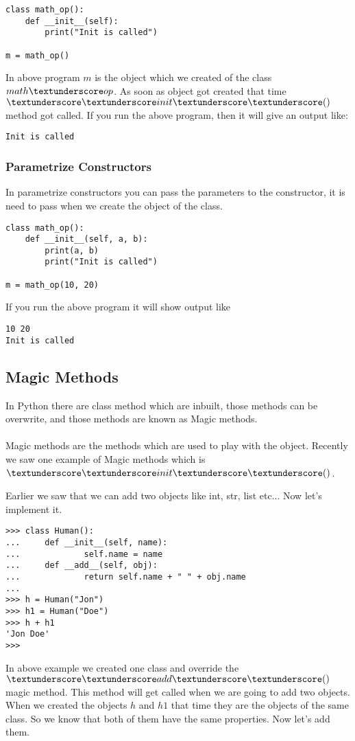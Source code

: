 \documentclass[letterpaper,12pt]{book}
\begin{document}
\begin{lstlisting}
class math_op():
    def __init__(self):
        print("Init is called")

m = math_op()
\end{lstlisting}
In above program $m$ is the object which we created of the class $math \textunderscore op$. As soon as object got created that time $\textunderscore\textunderscore init\textunderscore\textunderscore()$ method got called. 
If you run the above program, then it will give an output like:
\begin{lstlisting}
Init is called
\end{lstlisting}
\subsubsection{Parametrize Constructors}
In parametrize constructors you can pass the parameters to the constructor, it is need to pass when we create the object of the class.

\begin{lstlisting}
class math_op():
    def __init__(self, a, b):
        print(a, b)
        print("Init is called")
		
m = math_op(10, 20)
\end{lstlisting}
If you run the above program it will show output like
\begin{lstlisting}
10 20
Init is called
\end{lstlisting}
\subsection{Magic Methods}
In Python there are class method which are inbuilt, those methods can be overwrite, and those methods are known as Magic methods.
\paragraph{}
Magic methods are the methods which are used to play with the object. Recently we saw one example of Magic methods which is $\textunderscore\textunderscore init \textunderscore\textunderscore()$.

Earlier we saw that we can add two objects like int, str, list etc... Now let's implement it. 
\begin{lstlisting}
>>> class Human():
...     def __init__(self, name):
...             self.name = name
...     def __add__(self, obj):
...             return self.name + " " + obj.name
... 
>>> h = Human("Jon")
>>> h1 = Human("Doe")
>>> h + h1
'Jon Doe'
>>> 
\end{lstlisting} 
In above example we created one class and override the $\textunderscore\textunderscore add \textunderscore\textunderscore()$ magic method. This method will get called when we are going to add two objects. When we created the objects $h$ and $h1$ that time they are the objects of the same class. So we know that both of them have the same properties. Now let's add them. 
\end{document}
